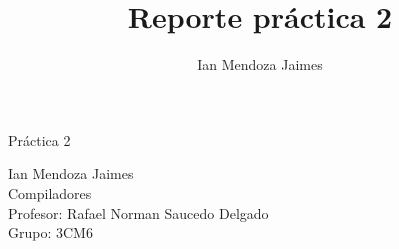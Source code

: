 \documentclass[12pt]{article}
\title{Reporte práctica 2}
\author{Ian Mendoza Jaimes}
\date{}
\begin{document}
\begin{titlepage}
\centering
	\vspace*{1.5in}
	\begin{huge}
		Práctica 2\\
	\end{huge}
	\vspace{4em}
	\begin{Large}
		Ian Mendoza Jaimes \\
		\vspace{4em}
		Compiladores \\
		\vspace{1em}
		Profesor: Rafael Norman Saucedo Delgado \\
		\vspace{1em}
		Grupo: 3CM6 \\
		\vspace{1em}
	\end{Large}
\end{titlepage}

\tableofcontents
{}
\pagebreak



\newpage



\newpage



\newpage



\vspace{3em}



\end{document}
